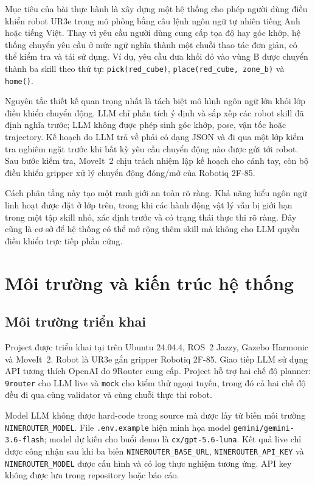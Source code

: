 \documentclass[12pt,a4paper]{article}
\newcommand{\projectpath}{\path{/home/admin1/hri_ws/src/ur3_llm_control}}
\begin{document}
Mục tiêu của bài thực hành là xây dựng một hệ thống cho phép người dùng điều khiển robot UR3e trong mô phỏng bằng câu lệnh ngôn ngữ tự nhiên tiếng Anh hoặc tiếng Việt. Thay vì yêu cầu người dùng cung cấp tọa độ hay góc khớp, hệ thống chuyển yêu cầu ở mức ngữ nghĩa thành một chuỗi thao tác đơn giản, có thể kiểm tra và tái sử dụng. Ví dụ, yêu cầu đưa khối đỏ vào vùng B được chuyển thành ba skill theo thứ tự: \texttt{pick(red\_cube)}, \texttt{place(red\_cube, zone\_b)} và \texttt{home()}.

Nguyên tắc thiết kế quan trọng nhất là tách biệt mô hình ngôn ngữ lớn khỏi lớp điều khiển chuyển động. LLM chỉ phân tích ý định và sắp xếp các robot skill đã định nghĩa trước; LLM không được phép sinh góc khớp, pose, vận tốc hoặc trajectory. Kế hoạch do LLM trả về phải có dạng JSON và đi qua một lớp kiểm tra nghiêm ngặt trước khi bất kỳ yêu cầu chuyển động nào được gửi tới robot. Sau bước kiểm tra, MoveIt~2 chịu trách nhiệm lập kế hoạch cho cánh tay, còn bộ điều khiển gripper xử lý chuyển động đóng/mở của Robotiq 2F-85.

Cách phân tầng này tạo một ranh giới an toàn rõ ràng. Khả năng hiểu ngôn ngữ linh hoạt được đặt ở lớp trên, trong khi các hành động vật lý vẫn bị giới hạn trong một tập skill nhỏ, xác định trước và có trạng thái thực thi rõ ràng. Đây cũng là cơ sở để hệ thống có thể mở rộng thêm skill mà không cho LLM quyền điều khiển trực tiếp phần cứng.

\section{Môi trường và kiến trúc hệ thống}

\subsection{Môi trường triển khai}

Project được triển khai tại \projectpath{} trên Ubuntu 24.04.4, ROS~2 Jazzy, Gazebo Harmonic và MoveIt~2. Robot là UR3e gắn gripper Robotiq 2F-85. Giao tiếp LLM sử dụng API tương thích OpenAI do 9Router cung cấp. Project hỗ trợ hai chế độ planner: \texttt{9router} cho LLM live và \texttt{mock} cho kiểm thử ngoại tuyến, trong đó cả hai chế độ đều đi qua cùng validator và cùng chuỗi thực thi robot.

Model LLM không được hard-code trong source mà được lấy từ biến môi trường \texttt{NINEROUTER\_MODEL}. File \texttt{.env.example} hiện minh họa model \texttt{gemini/gemini-3.6-flash}; model dự kiến cho buổi demo là \texttt{cx/gpt-5.6-luna}. Kết quả live chỉ được công nhận sau khi ba biến \texttt{NINEROUTER\_BASE\_URL}, \texttt{NINEROUTER\_API\_KEY} và \texttt{NINEROUTER\_MODEL} được cấu hình và có log thực nghiệm tương ứng. API key không được lưu trong repository hoặc báo cáo.
\end{document}
